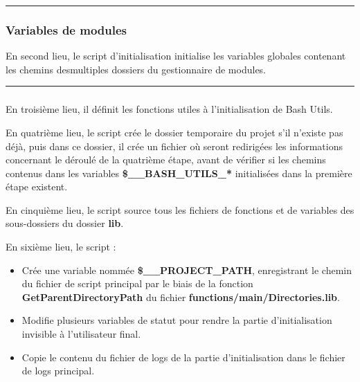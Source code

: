\documentclass[a4paper,10pt]{article}
\begin{document}
\color{blue}\par\noindent\rule{\textwidth}{0.4pt}\color{white}

\color{blue}
\subsubsection{Variables de modules}\color{white}
En second lieu, le script d'initialisation initialise les variables globales contenant les chemins des\linebreak multiples dossiers du gestionnaire de modules.\\[1\baselineskip]



\color{blue}\par\noindent\rule{\textwidth}{0.4pt}\color{white}

\color{blue}
\subsubsection{}\color{white}
En troisième lieu, il définit les fonctions utiles à l'initialisation de Bash Utils.



En quatrième lieu, le script crée le dossier temporaire du projet s'il n'existe pas déjà, puis dans ce dossier, il crée un fichier où seront redirigées les informations concernant le déroulé de la quatrième étape, avant de vérifier si les chemins contenus dans les variables \color{orange}\textbf{\$\_\_BASH\_UTILS\_*}\color{white} initialisées dans la première étape existent.

En cinquième lieu, le script source tous les fichiers de fonctions et de variables des sous-dossiers du dossier \color{lime}\textbf{lib}\color{white}.

En sixième lieu, le script :
\begin{itemize}
    \item Crée une variable nommée \color{orange}\textbf{\$\_\_PROJECT\_PATH}\color{white}, enregistrant le chemin du fichier de script principal par le biais de la fonction \color{mauve}\textbf{GetParentDirectoryPath} \color{white} du fichier \color{lime}\textbf{functions/main/Directories.lib}\color{white}.
    
    \item Modifie plusieurs variables de statut pour rendre la partie d'initialisation invisible à l'utilisateur final.
    
    \item Copie le contenu du fichier de logs de la partie d'initialisation dans le fichier de logs principal.\\[1\baselineskip]
\end{itemize}
\end{document}
